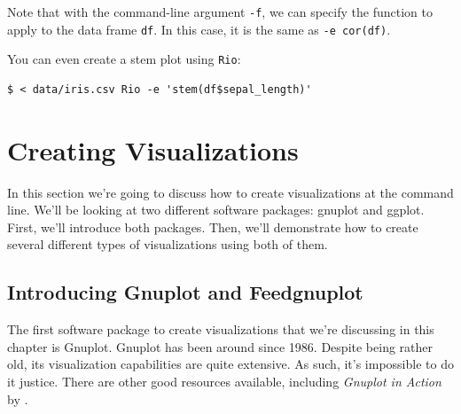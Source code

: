 \documentclass[
]{book}
\newenvironment{Shaded}{\begin{snugshade}}{\end{snugshade}}
\newcommand{\ExtensionTok}[1]{#1}
\newcommand{\KeywordTok}[1]{\textcolor[rgb]{0.13,0.29,0.53}{\textbf{#1}}}
\newcommand{\NormalTok}[1]{#1}
\newcommand{\OperatorTok}[1]{\textcolor[rgb]{0.81,0.36,0.00}{\textbf{#1}}}
\theoremstyle{definition}
\theoremstyle{definition}
\theoremstyle{definition}
\theoremstyle{remark}
\begin{document}
\begin{Shaded}
\end{Shaded}

Note that with the command-line argument \texttt{-f}, we can specify the function to apply to the data frame \texttt{df}. In this case, it is the same as \texttt{-e\ cor(df)}.

You can even create a stem plot \citep{Tukey1977} using \texttt{Rio}:

\begin{verbatim}
$ < data/iris.csv Rio -e 'stem(df$sepal_length)'
\end{verbatim}

\hypertarget{creating-visualizations}{%
\section{Creating Visualizations}\label{creating-visualizations}}

In this section we're going to discuss how to create visualizations at the command line. We'll be looking at two different software packages: gnuplot and ggplot. First, we'll introduce both packages. Then, we'll demonstrate how to create several different types of visualizations using both of them.

\hypertarget{introducing-gnuplot-and-feedgnuplot}{%
\subsection{Introducing Gnuplot and Feedgnuplot}\label{introducing-gnuplot-and-feedgnuplot}}

The first software package to create visualizations that we're discussing in this chapter is Gnuplot. Gnuplot has been around since 1986. Despite being rather old, its visualization capabilities are quite extensive. As such, it's impossible to do it justice. There are other good resources available, including \emph{Gnuplot in Action} by \citet{Janert2009}.
\end{document}
